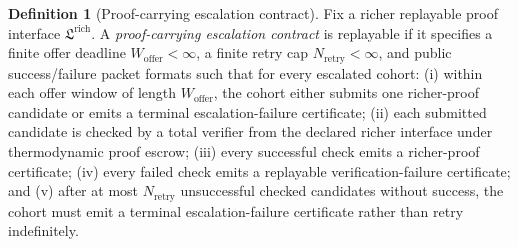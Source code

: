 \documentclass[11pt]{article}
\theoremstyle{definition}
\newtheorem{definition}[theorem]{Definition}
\newcommand{\1}{\mathbf{1}}
\begin{document}
\begin{definition}[Proof-carrying escalation contract]\label{def:proof_escalation}
Fix a richer replayable proof interface $\mathfrak L^{\mathrm{rich}}$. A \emph{proof-carrying escalation contract} is replayable if it specifies a finite offer deadline $W_{\mathrm{offer}}<\infty$, a finite retry cap $N_{\mathrm{retry}}<\infty$, and public success/failure packet formats such that for every escalated cohort: (i) within each offer window of length $W_{\mathrm{offer}}$, the cohort either submits one richer-proof candidate or emits a terminal escalation-failure certificate; (ii) each submitted candidate is checked by a total verifier from the declared richer interface under thermodynamic proof escrow; (iii) every successful check emits a richer-proof certificate; (iv) every failed check emits a replayable verification-failure certificate; and (v) after at most $N_{\mathrm{retry}}$ unsuccessful checked candidates without success, the cohort must emit a terminal escalation-failure certificate rather than retry indefinitely.
\end{definition}
\end{document}

